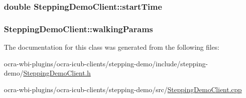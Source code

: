 \hypertarget{classSteppingDemoClient_af7b6e48319ef9d35fb975edc3bb2a137}{
\subsubsection[{start\-Time}]{\setlength{\rightskip}{0pt plus 5cm}double {\bf \-Stepping\-Demo\-Client\-::start\-Time}}}\label{classSteppingDemoClient_af7b6e48319ef9d35fb975edc3bb2a137}
\hypertarget{classSteppingDemoClient_a113c2d838e3db1d18f4843a8828e30d4}{
\subsubsection[{walking\-Params}]{ {\bf \-Stepping\-Demo\-Client\-::walking\-Params}}}\label{classSteppingDemoClient_a113c2d838e3db1d18f4843a8828e30d4}


\-The documentation for this class was generated from the following files\-:\begin{DoxyCompactItemize}
\item 
ocra-\/wbi-\/plugins/ocra-\/icub-\/clients/stepping-\/demo/include/stepping-\/demo/\hyperlink{SteppingDemoClient_8h}{\-Stepping\-Demo\-Client.\-h}\item 
ocra-\/wbi-\/plugins/ocra-\/icub-\/clients/stepping-\/demo/src/\hyperlink{SteppingDemoClient_8cpp}{\-Stepping\-Demo\-Client.\-cpp}\end{DoxyCompactItemize}
